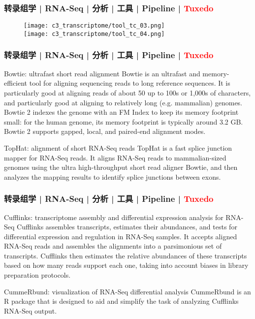 \begin{frame}
  \frametitle{转录组学 | RNA-Seq | 分析 | 工具 | Pipeline | \textcolor{red}{Tuxedo}}
  \begin{figure}
    \centering
    \texttt{[image: c3\_transcriptome/tool\_tc\_03.png]}\\
    \vspace{0.5em}
    \texttt{[image: c3\_transcriptome/tool\_tc\_04.png]}
  \end{figure}
\end{frame}

\begin{frame}
  \frametitle{转录组学 | RNA-Seq | 分析 | 工具 | Pipeline | \textcolor{red}{Tuxedo}}
  \begin{block}{Bowtie: ultrafast short read alignment}
    Bowtie is an ultrafast and memory-efficient tool for aligning sequencing reads to long reference sequences. It is particularly good at aligning reads of about 50 up to 100s or 1,000s of characters, and particularly good at aligning to relatively long (e.g. mammalian) genomes. Bowtie 2 indexes the genome with an FM Index to keep its memory footprint small: for the human genome, its memory footprint is typically around 3.2 GB. Bowtie 2 supports gapped, local, and paired-end alignment modes.
  \end{block}
  \pause
  \begin{block}{TopHat: alignment of short RNA-Seq reads}
    TopHat is a fast splice junction mapper for RNA-Seq reads. It aligns RNA-Seq reads to mammalian-sized genomes using the ultra high-throughput short read aligner Bowtie, and then analyzes the mapping results to identify splice junctions between exons.
  \end{block}
\end{frame}

\begin{frame}
  \frametitle{转录组学 | RNA-Seq | 分析 | 工具 | Pipeline | \textcolor{red}{Tuxedo}}
  \begin{block}{Cufflinks: transcriptome assembly and differential expression analysis for RNA-Seq}
    Cufflinks assembles transcripts, estimates their abundances, and tests for differential expression and regulation in RNA-Seq samples. It accepts aligned RNA-Seq reads and assembles the alignments into a parsimonious set of transcripts. Cufflinks then estimates the relative abundances of these transcripts based on how many reads support each one, taking into account biases in library preparation protocols.
  \end{block}
  \pause
  \begin{block}{CummeRbund: visualization of RNA-Seq differential analysis}
    CummeRbund is an R package that is designed to aid and simplify the task of analyzing Cufflinks RNA-Seq output.
  \end{block}
\end{frame}

